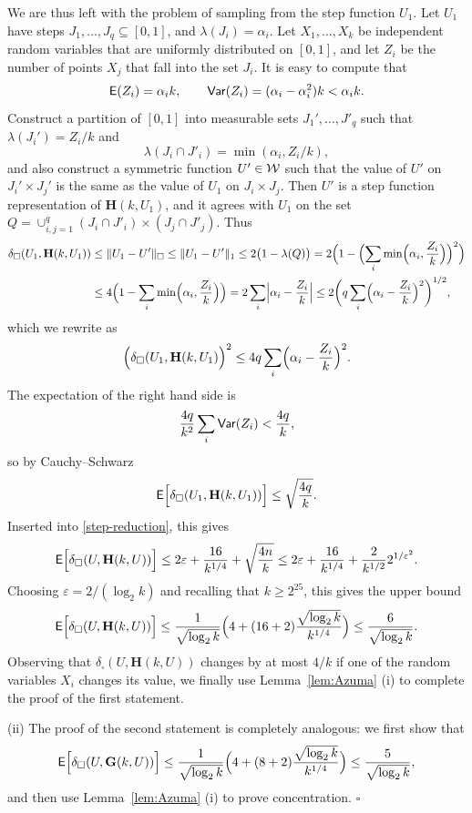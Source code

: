 \documentclass[12pt]{article}
\numberwithin{equation}{section}
\newenvironment{proof}{\medskip\noindent{\bf Proof.
}}{\hfill$\square$\medskip}
\def\eps{\varepsilon}
\def\E{{\sf E}}
\def\Var{{\sf Var}}
\def\bG{{\mathbf G}}
\def\bH{{\mathbf H}}
\begin{document}
\begin{proof}
{We are thus left with the problem of sampling from the step function $U_1$.}
Let $U_1$ have steps $J_1,\dots,J_q\subseteq[0,1]$, and
$\lambda(J_i)=\alpha_i$. { Let $X_1,\dots,X_k$ be independent random
variables that are uniformly distributed on $[0,1]$, and let $Z_i$ be
the number of points $X_j$ that fall into the set $J_i$.}
It is easy to compute that
\[
\E(Z_i)=\alpha_i k, \qquad \Var(Z_i) = (\alpha_i-\alpha_i^2)k <
\alpha_ik.
\]
Construct a partition of $[0,1]$ into measurable sets
$J_1',\dots,J'_q$ such that { $\lambda(J_i')=Z_i/k$ and}
\[
\lambda(J_i\cap J'_i)=\min(\alpha_i, Z_i/k),
\]
and also construct a symmetric function $U'\in{\cal W}$ such that the
value of $U'$ on $J_i'\times J_j'$ is the same as the value of $U_1$
on $J_i\times J_j$. Then $U'$ is a step function representation of
$\bH(k,U_1)$, and it agrees with $U_1$ on the set
$
Q=\cup_{i,j=1}^q (J_i\cap J'_i)\times (J_j\cap J'_j).
$
Thus
\begin{align*}
\delta_\square(U_1,\bH(k,U_1)) &\le \|U_1-U'\|_\square \le \|U_1-U'\|_1
\le
{ 2\big(} 1-\lambda(Q) { \big)} = { 2\Bigl(} 1-\Bigl(\sum_i
\min\Bigr(\alpha_i, \frac{Z_i}{k}\Bigl)\Bigr)^2 { \Bigr)}
\\
&\le { 4}\Bigl(1-\sum_i \min\Bigr(\alpha_i, \frac{Z_i}{k}\Bigl)\Bigr)
= { 2}\sum_i\Bigl|\alpha_i-\frac{Z_i}{k}\Bigr| \le { 2\bigg(}q
\sum_i\Bigl(\alpha_i-\frac{Z_i}{k}\Bigr)^2{\bigg)^{1/2}},
\end{align*}
which we rewrite as
\[
\Bigl(\delta_\square(U_1,\bH(k,U_1)\Bigr)^2\leq 4
q\sum_i\Bigl(\alpha_i-\frac{Z_i}{k}\Bigr)^2.
\]
The expectation of the right hand side is
\[
\frac{{ 4}q}{k^2}\sum_i \Var(Z_i)<\frac{{ 4}q}{k},
\]
so by Cauchy--Schwarz
\begin{equation}
\label{STEP-SAMPLE}
\E\Bigl[\delta_\square(U_1,\bH(k,U_1))\Bigr]
\leq\sqrt{\frac{{ 4}q}{k}}.
\end{equation}
Inserted into \eqref{step-reduction}, this gives
\[
\E\Bigl[\delta_\square(U, \bH(k,U))\Bigr]
\leq
2\eps+\frac{16}{k^{1/4}}+
\sqrt{\frac{{ 4}n}{k}}
\leq 2\eps+\frac{16}{k^{1/4}}+
\frac 2{k^{1/2}}2^{1/\eps^{2}}.
\]
Choosing $\eps=2/(\log_2 k)$ and recalling that $k\geq 2^{25}$, this
gives the upper bound
\begin{equation}
\label{E-sample-bound}
\E\Bigl[\delta_\square(U, \bH(k,U))\Bigr]
\leq \frac{1}{\sqrt{\log_2 k}}
\Bigl(4+ (16+2)
\frac{\sqrt{\log_2 k}}{k^{1/4}}\Bigr)
\leq \frac{6}{ \sqrt{\log_2 k}}.
\end{equation}
Observing that $\delta_\square(U, \bH(k,U))$ changes by at most
$4/k$ if one of the random variables $X_i$ changes its value,
we finally use Lemma~\ref{lem:Azuma} (i)
to complete the proof of the first statement.

(ii) The proof of the
second statement is completely analogous: we first show that
\begin{equation}
\label{E-G-sample-bound}
\E\Bigl[\delta_\square(U, \bG(k,U))\Bigr]\leq
\frac{1}{\sqrt{\log_2 k}}
\Bigl(4+ (8+2)
\frac{\sqrt{\log_2 k}}{k^{1/4}}\Bigr)
\leq\frac{5}{\sqrt{\log_2 k}}
,
\end{equation}
and then use Lemma~\ref{lem:Azuma} (i) to prove concentration.
\end{proof}
\end{document}
